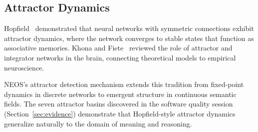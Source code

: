 \subsection{Attractor Dynamics}

Hopfield~\cite{hopfield1982neural} demonstrated that neural networks with symmetric connections exhibit attractor dynamics, where the network converges to stable states that function as associative memories. Khona and Fiete~\cite{khona2022attractor} reviewed the role of attractor and integrator networks in the brain, connecting theoretical models to empirical neuroscience.

NEOS's attractor detection mechanism extends this tradition from fixed-point dynamics in discrete networks to emergent structure in continuous semantic fields. The seven attractor basins discovered in the software quality session (Section~\ref{sec:evidence}) demonstrate that Hopfield-style attractor dynamics generalize naturally to the domain of meaning and reasoning.
